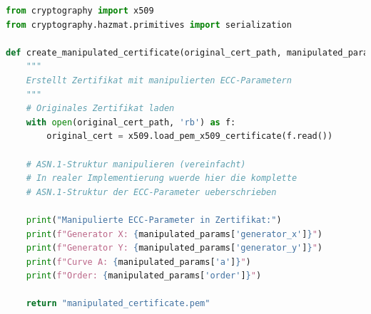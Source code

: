 \documentclass{article}
\begin{document}
\begin{lstlisting}[language=python, caption=Zertifikat-Parameter überschreiben]
from cryptography import x509
from cryptography.hazmat.primitives import serialization

def create_manipulated_certificate(original_cert_path, manipulated_params):
    """
    Erstellt Zertifikat mit manipulierten ECC-Parametern
    """
    # Originales Zertifikat laden
    with open(original_cert_path, 'rb') as f:
        original_cert = x509.load_pem_x509_certificate(f.read())
    
    # ASN.1-Struktur manipulieren (vereinfacht)
    # In realer Implementierung wuerde hier die komplette
    # ASN.1-Struktur der ECC-Parameter ueberschrieben
    
    print("Manipulierte ECC-Parameter in Zertifikat:")
    print(f"Generator X: {manipulated_params['generator_x']}")
    print(f"Generator Y: {manipulated_params['generator_y']}")
    print(f"Curve A: {manipulated_params['a']}")
    print(f"Order: {manipulated_params['order']}")
    
    return "manipulated_certificate.pem"
\end{lstlisting}
\end{document}

